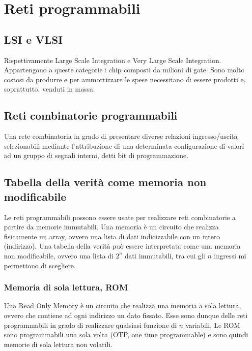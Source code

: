 \documentclass{article}
\begin{document}
\section{Reti programmabili}

\subsection{LSI e VLSI}

Rispettivamente Large Scale Integration e Very Large Scale Integration.
Appartengono a queste categorie i chip composti da milioni di gate.
Sono molto costosi da produrre e per ammortizzare le spese necessitano di essere prodotti e, soprattutto, venduti in massa.

\subsection{Reti combinatorie programmabili}

Una rete combinatoria in grado di presentare diverse relazioni ingresso/uscita selezionabili mediante l'attribuzione di una determinata configurazione di valori ad un gruppo di segnali interni, detti bit di programmazione.

\subsection{Tabella della verità come memoria non modificabile}

Le reti programmabili possono essere usate per realizzare reti combinatorie a partire da memorie immutabili.
Una memoria è un circuito che realizza fisicamente un array, ovvero una lista di dati indicizzabile con un intero (indirizzo).
Una tabella della verità può essere interpretata come una memoria non modificabile, ovvero una lista di $2^n$ dati immutabili, tra cui gli $n$ ingressi mi permettono di scegliere.

\subsubsection{Memoria di sola lettura, ROM}

Una Read Only Memory è un circuito che realizza una memoria a sola lettura, ovvero che contiene ad ogni indirizzo un dato fissato.
Esse sono dunque delle reti programmabili in grado di realizzare qualsiasi funzione di $n$ variabili.
Le ROM sono programmabili una sola volta (OTP, one time programmable) e sono quindi memorie di sola lettura non volatili.
\end{document}
